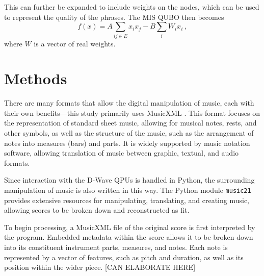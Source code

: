 \documentclass[aps,pra,10pt,twocolumn]{revtex4-2}
\begin{document}
This can further be expanded to include weights on the nodes, which can be used to represent the quality of the phrases. The MIS QUBO then becomes
\begin{equation}
    f(x)=A\sum_{ij\in E}x_ix_j-B\sum_i W_ix_i\,,
    \label{eq:weightedMIS}
\end{equation}
where $W$ is a vector of real weights.








\newpage
\section{Methods}

There are many formats that allow the digital manipulation of music, each with their own benefits—this study primarily uses MusicXML \cite{musicxml}. This format focuses on the representation of standard sheet music, allowing for musical notes, rests, and other symbols, as well as the structure of the music, such as the arrangement of notes into measures (bars) and parts. It is widely supported by music notation software, allowing translation of music between graphic, textual, and audio formats.

Since interaction with the D-Wave QPUs is handled in Python, the surrounding manipulation of music is also written in this way. The Python module \verb|music21| provides extensive resources for manipulating, translating, and creating music, allowing scores to be broken down and reconstructed as fit.

To begin processing, a MusicXML file of the original score is first interpreted by the program. Embedded metadata within the score allows it to be broken down into its constituent instrument parts, measures, and notes. Each note is represented by a vector of features, such as pitch and duration, as well as its position within the wider piece. [CAN ELABORATE HERE]
\end{document}
